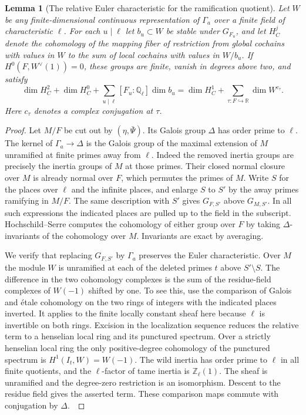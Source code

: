 \documentclass[a4paper,11pt]{article}
\newtheorem{lemma}[proposition]{Lemma}
\theoremstyle{definition}
\theoremstyle{remark}
\newcommand{\RR}{\mathbb R}\newcommand{\CC}{\mathbb C}\newcommand{\QQ}{\mathbb Q}
\newcommand{\ZZ}{\mathbb Z}\newcommand{\ord}{\operatorname{ord}}
\numberwithin{equation}{section}
\begin{document}
\begin{lemma}[The relative Euler characteristic for the ramification quotient]
\label{lem:frameeuler365}
Let \(W\) be any finite-dimensional continuous representation
of \(\Gamma_a\) over a finite field of characteristic \(\ell\).
For each \(u\mid\ell\) let \(b_u\subset W\) be stable under
\(G_{F_u}\), and let \(H^j_C\) denote the cohomology of the
mapping fiber of restriction from global cochains with values
in \(W\) to the sum of local cochains with values in \(W/b_u\).
If \(H^0(F,W^\vee(1))=0\), these groups are finite, vanish in
degrees above two, and satisfy
\[
 \dim H^2_C+\dim H^0_C+\sum_{u\mid\ell}[F_u:\QQ_\ell]\dim b_u
       =\dim H^1_C+\sum_{\tau:F\hookrightarrow\RR}\dim W^{c_\tau}.
\]
Here \(c_\tau\) denotes a complex conjugation at \(\tau\).
\end{lemma}
\begin{proof}
Let \(M/F\) be cut out by \((\eta,\bar\Psi)\). Its Galois
group \(\Delta\) has order prime to \(\ell\). The kernel of
\(\Gamma_a\to\Delta\) is the Galois group of the maximal
extension of \(M\) unramified at finite primes away from
\(\ell\). Indeed the removed inertia groups are precisely
the inertia groups of \(M\) at those primes. Their closed
normal closure over \(M\) is already normal over \(F\),
which permutes the primes of \(M\). Write \(S\) for the places
over \(\ell\) and the infinite places, and enlarge \(S\) to
\(S'\) by the away primes ramifying in \(M/F\). The same
description with \(S'\) gives \(G_{F,S'}\) above \(G_{M,S'}\).
In all such expressions the indicated places are pulled up
to the field in the subscript. Hochschild--Serre computes
the cohomology of either group over \(F\) by taking
\(\Delta\)-invariants of the cohomology over \(M\).
Invariants are exact by averaging.

We verify that replacing \(G_{F,S'}\) by \(\Gamma_a\) preserves
the Euler characteristic. Over \(M\) the module \(W\) is
unramified at each of the deleted primes \(t\) above
\(S'\setminus S\). The difference in the two cohomology
complexes is the sum of the residue-field complexes of
\(W(-1)\) shifted by one. To see this, use the comparison of
Galois and \'etale cohomology on the two rings of integers
with the indicated places inverted. It applies to the finite
locally constant sheaf here because \(\ell\) is invertible
on both rings. Excision in the localization sequence reduces
the relative term to a henselian local ring and its punctured
spectrum. Over a strictly henselian local ring the only
positive-degree cohomology of the punctured spectrum is
\(H^1(I_t,W)=W(-1)\). The wild inertia has order prime to
\(\ell\) in all finite quotients, and the \(\ell\)-factor
of tame inertia is \(\ZZ_\ell(1)\). The sheaf is unramified
and the degree-zero restriction is an isomorphism. Descent
to the residue field gives the asserted term. These comparison
maps commute with conjugation by \(\Delta\).~\cite{VII-V-V-milne98}


\end{proof}
\end{document}
